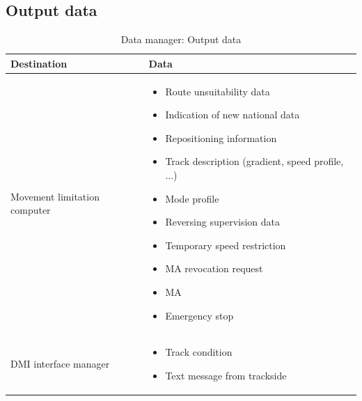\documentclass[nocc]{template/openetcs_report}
\begin{document}
\subsection{Output data}
			\begin{longtable}{|l|l|}
				\caption{Data manager: Output data}\\ 
				\hline
				
					\begin{minipage}[t]{0.35\linewidth} \textbf{Destination}	\end{minipage} 
				&	\begin{minipage}[t]{0.65\linewidth} \textbf{Data} \end{minipage} \\
				
				\hline
																																									
					\begin{minipage}[t]{0.35\linewidth} Movement limitation computer	\end{minipage} 
				&	\begin{minipage}[t]{0.65\linewidth}
						\begin{itemize}
							\item Route unsuitability data
							\item Indication of new national data
							\item Repositioning information
							\item Track description (gradient, speed profile, ...)
							\item Mode profile
							\item Reversing supervision data
							\item Temporary speed restriction
							\item MA revocation request
							\item MA
							\item Emergency stop						
						\end{itemize}
					\end{minipage} \\
				
				\hline
				
					\begin{minipage}[t]{0.35\linewidth} DMI interface manager	\end{minipage} 
				&	\begin{minipage}[t]{0.65\linewidth}
						\begin{itemize}
							\item Track condition
							\item Text message from trackside
						\end{itemize}			
					\end{minipage} \\
				

\end{longtable}
\end{document}
